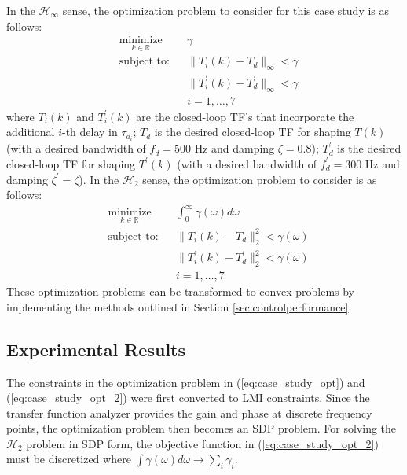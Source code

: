 \documentclass[a4paper, 10pt, conference]{ieeeconf}
\begin{document}
In the $\mathcal{H}_{\infty}$ sense, the optimization problem to consider for this case study is as follows:
 \begin{equation} \label{eq:case_study_opt}
\begin{aligned}
& \underset{ k \in \mathbb{R}}{\text{minimize}}
& & \gamma  \\
& \text{subject to:} & & \|T_i(k)-T_d\|_{\infty}< \gamma \\
& &  &\|T_i^{\prime}(k)-T_d^{\prime}\|_{\infty}< \gamma \\ 
& & & i = 1,\ldots,7
\end{aligned}
\end{equation}
where $T_i(k)$ and $T_i^{\prime}(k)$ are the closed-loop TF's that incorporate the additional $i$-th delay in $\tau_{a_i}$; $T_d$ is the desired closed-loop TF for shaping $T(k)$ (with a desired bandwidth of $f_d = 500$ Hz and damping $\zeta = 0.8$); $T_d^{\prime}$ is the desired closed-loop TF for shaping $T^{\prime}(k)$ (with a desired bandwidth of $f_d^{\prime} = 300$ Hz and damping $\zeta^{\prime} = \zeta$). In the $\mathcal{H}_2$ sense, the optimization problem to consider is as follows:
\begin{equation} \label{eq:case_study_opt_2}
\begin{aligned}
& \underset{ k \in \mathbb{R}}{\text{minimize}}
& & \int_0^{\infty} \gamma(\omega) d\omega  \\
& \text{subject to:} & & \|T_i(k)-T_d\|_2^2< \gamma(\omega) \\
& &  &\|T_i^{\prime}(k)-T_d^{\prime}\|_2^2< \gamma(\omega) \\ 
& & & i = 1,\ldots,7
\end{aligned}
\end{equation}
These optimization problems can be transformed to convex problems by implementing the methods outlined in Section \ref{sec:controlperformance}. 
\subsection{Experimental Results}
The constraints in the optimization problem in (\ref{eq:case_study_opt}) and (\ref{eq:case_study_opt_2}) were first converted to LMI constraints. Since the transfer function analyzer provides the gain and phase at discrete frequency points, the optimization problem then becomes an SDP problem. For solving the $\mathcal{H}_2$ problem in SDP form, the objective function in (\ref{eq:case_study_opt_2}) must be discretized where $\int \gamma(\omega) d\omega \rightarrow \sum_i \gamma_i$.
\end{document}
